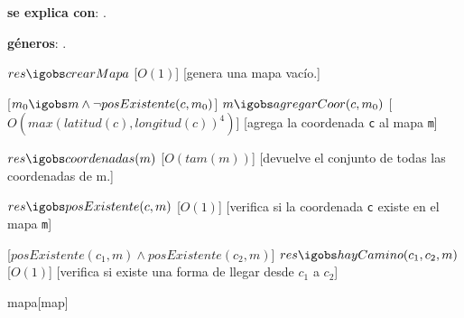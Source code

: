 \begin{Interfaz}


\textbf{se explica con}: .

\textbf{g\'eneros}: .



%
{$res \igobs crearMapa$}%
[$O(1)$]
[genera una mapa vac\'io.]


[$m_0 \igobs m \land \lnot posExistente(c, m_0) $]  
{$m \igobs agregarCoor(c, m_0)$}
[$O(  max(latitud(c), longitud(c))^4  )$]
[agrega la coordenada \texttt{c} al mapa \texttt{m}]


%
{$res \igobs coordenadas(m)$}%
[$O(tam(m))$]  %
[devuelve el conjunto de todas las coordenadas de m.]


{$res \igobs posExistente(c, m)$}
[$O(1)$]
[verifica si la coordenada \texttt{c} existe en el mapa \texttt{m}]


[$posExistente(c_1, m) \land posExistente(c_2, m) $]
{$res \igobs hayCamino(c_1, c_2, m)$}
[$O(1)$]
[verifica si existe una forma de llegar desde \texttt{$c_1$} a \texttt{$c_2$}]


\end{Interfaz}

\begin{Representacion}

\begin{Estructura}{mapa}[map]
	\begin{Tupla}[map]  
  	\end{Tupla}
  	
\end{Estructura}




  

  \AbsFc[]{}

\end{Representacion}

